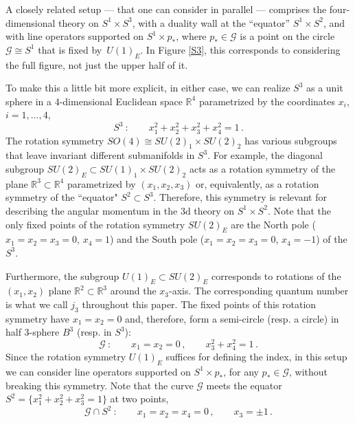 \documentclass[11pt,letterpaper]{article}
\numberwithin{equation}{section}
\newcommand{\be}{\begin{equation}}
\newcommand{\ee}{\end{equation}}
\newcommand{\R}{{\mathbb R}}
\newcommand{\CG}{\mathcal{G}}
\begin{document}
A closely related setup --- that one can consider in parallel --- comprises the four-dimensional theory on $S^1 \times S^3$,
with a duality wall at the ``equator'' $S^1 \times S^2$, and with line operators supported on $S^1 \times p_*$, where $p_* \in \CG$
is a point on the circle $\CG \cong S^1$ that is fixed by~$U(1)_E$.
In Figure \ref{S3}, this corresponds to considering the full figure, not just the upper half of it.

To make this a little bit more explicit, in either case, we can realize $S^3$ as a unit sphere in
a 4-dimensional Euclidean space $\R^4$ parametrized by the coordinates $x_i$, $i=1, \ldots, 4$,
\be
S^3 ~: \qquad x_1^2 + x_2^2 + x_3^2 + x_4^2 = 1 \,.
\ee
The rotation symmetry $SO(4) \cong SU(2)_1 \times SU(2)_2$ has various subgroups
that leave invariant different submanifolds in $S^3$.
For example, the diagonal subgroup $SU(2)_E \subset SU(1)_1 \times SU(2)_2$
acts as a rotation symmetry of the plane $\R^3 \subset \R^4$ parametrized by $(x_1,x_2,x_3)$
or, equivalently, as a rotation symmetry of the ``equator" $S^2 \subset S^3$.
Therefore, this symmetry is relevant for describing the angular momentum in the 3d theory on $S^1 \times S^2$.
Note that the only fixed points of the rotation symmetry $SU(2)_E$ are the North pole ($x_1 = x_2 = x_3 = 0$, $x_4 = 1$)
and the South pole ($x_1 = x_2 = x_3 = 0$, $x_4 = -1$) of the $S^3$.

Furthermore, the subgroup $U(1)_E \subset SU(2)_E$ corresponds to rotations of the $(x_1,x_2)$ plane $\R^2 \subset \R^3$
around the $x_3$-axis. The corresponding quantum number is what we call $j_3$ throughout this paper.
The fixed points of this rotation symmetry have $x_1 = x_2 = 0$ and, therefore, form a semi-circle (resp. a circle)
in half 3-sphere $B^3$ (resp. in $S^3$):
\be
\CG  ~: \qquad x_1 = x_2 = 0 \,, \qquad x_3^2 + x_4^2 = 1 \,.
\ee
Since the rotation symmetry $U(1)_E$ suffices for defining the index,
in this setup we can consider line operators supported on $S^1 \times p_*$, for any $p_* \in \CG$, without breaking this symmetry.
Note that the curve $\CG$ meets the equator $S^2 = \{ x_1^2 + x_2^2 + x_3^2 = 1 \}$ at two points,
\be
\CG \cap S^2 ~: \qquad x_1 = x_2 = x_4 = 0 \,, \qquad x_3 = \pm 1 \,.
\ee
\end{document}
